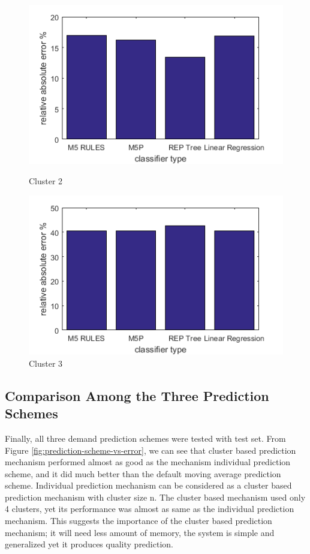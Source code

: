 \begin{figure}
\centering
\begin{minipage}{.5\textwidth}
  \centering
  \includegraphics[width=\linewidth]{cluster-2-diff-classifier-relative-abs.png}
  \caption{Cluster 2}
  \label{fig:cluster-2-predictors}
\end{minipage}%
\begin{minipage}{.5\textwidth}
  \centering
  \includegraphics[width=\linewidth]{cluster-3-diff-classifier-relative-abs.png}
  \caption{Cluster 3}
\label{fig:cluster-3-predictors}
\end{minipage}

\end{figure}


\subsection{Comparison Among the Three Prediction Schemes}

Finally, all three demand prediction schemes were tested with test set. From Figure \ref{fig:prediction-scheme-vs-error}, we can see that cluster based prediction mechanism performed almost as good as the mechanism individual prediction scheme, and it did much better than the default moving average prediction scheme. Individual prediction mechanism can be considered as a cluster based prediction mechanism with cluster size n. The cluster based mechanism used only 4 clusters, yet its performance was almost as same as the individual prediction mechanism. This suggests the importance of the cluster based prediction mechanism; it will need less amount of memory, the system is simple and generalized yet it produces quality prediction.

